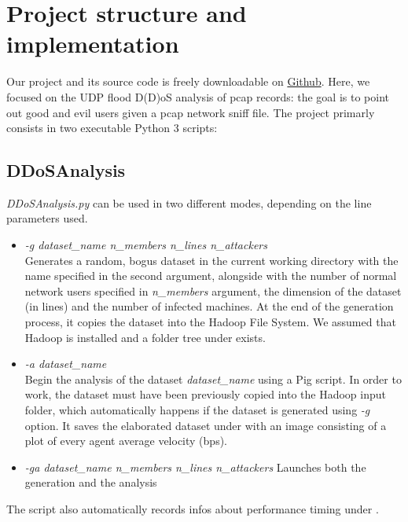 \section{Project structure and implementation}
Our project and its source code is freely downloadable on \href{https://github.com/CristianTuretta/DDoS-Network-Flow-Forensics-Analyser-.git}{Github}. Here, we focused on the UDP flood D(D)oS analysis of pcap records: the goal is to point out good and evil users given a pcap network sniff file. The project primarly consists in two executable Python 3 scripts:
\subsection{DDoSAnalysis}
\textit{DDoSAnalysis.py} can be used in two different modes, depending on the line parameters used. 
	\begin{itemize}
		\item \textit{-g dataset\_name n\_members n\_lines n\_attackers} \\Generates a random, bogus dataset in the current working directory with the name specified in the second argument, alongside with the number of normal network users specified in \textit{n\_members} argument, the dimension of the dataset (in lines) and the number of infected machines. At the end of the generation process, it copies the dataset into the Hadoop File System. We assumed that Hadoop is installed and a folder tree under  exists.
		\item \textit{-a dataset\_name} \\Begin the analysis of the dataset \textit{dataset\_name} using a Pig script. In order to work, the dataset must have been previously copied into the Hadoop input folder, which automatically happens if the dataset is generated using \textit{-g} option. It saves the elaborated dataset under  with an image consisting of a plot of every agent average velocity (bps).
		\item \textit{-ga dataset\_name n\_members n\_lines n\_attackers} Launches both the generation and the analysis 
	\end{itemize}
The script also automatically records infos about performance timing under .

